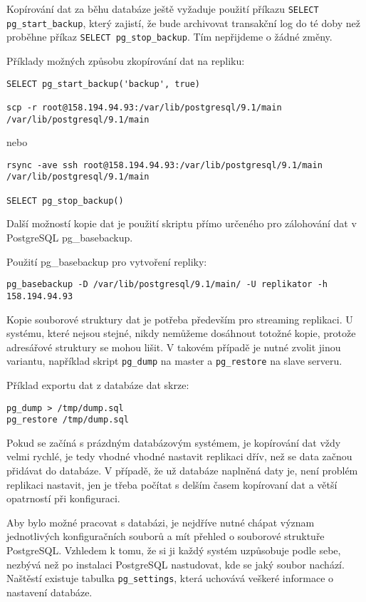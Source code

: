 Kopírování dat za běhu databáze ještě vyžaduje použití příkazu \texttt{SELECT pg\_start\_backup}, který zajistí, že bude archivovat transakční log do té doby než proběhne příkaz \texttt{SELECT pg\_stop\_backup}. Tím nepřijdeme o žádné změny.

Příklady možných způsobu zkopírování dat na repliku:

\begin{lstlisting}
SELECT pg_start_backup('backup', true)

scp -r root@158.194.94.93:/var/lib/postgresql/9.1/main /var/lib/postgresql/9.1/main
\end{lstlisting}
\indent nebo
\begin{lstlisting}
rsync -ave ssh root@158.194.94.93:/var/lib/postgresql/9.1/main /var/lib/postgresql/9.1/main

SELECT pg_stop_backup()
\end{lstlisting}

Další možností kopie dat je použití skriptu přímo určeného pro zálohování dat v PostgreSQL pg\_basebackup. 

Použití pg\_basebackup pro vytvoření repliky:

\begin{lstlisting}
pg_basebackup -D /var/lib/postgresql/9.1/main/ -U replikator -h 158.194.94.93
\end{lstlisting}

Kopie souborové struktury dat je potřeba především pro streaming replikaci. U systému, které nejsou stejné, nikdy nemůžeme dosáhnout totožné kopie, protože adresářové struktury se mohou lišit. V takovém případě je nutné zvolit jinou variantu, například skript \texttt{pg\_dump} na master a \texttt{pg\_restore} na slave serveru. 

Příklad exportu dat z databáze dat skrze:
\begin{lstlisting}
pg_dump > /tmp/dump.sql
pg_restore /tmp/dump.sql
\end{lstlisting}

Pokud se začíná s prázdným databázovým systémem, je kopírování dat vždy velmi rychlé, je tedy vhodné vhodné nastavit replikaci dřív, než se data začnou přidávat do databáze. V případě, že už databáze naplněná daty je, není problém replikaci nastavit, jen je třeba počítat s delším časem kopírovaní dat a větší opatrností při konfiguraci. 

Aby bylo možné pracovat s databázi, je nejdříve nutné chápat význam jednotlivých konfiguračních souborů a mít přehled o souborové struktuře PostgreSQL. Vzhledem k tomu, že si ji každý systém uzpůsobuje podle sebe, nezbývá než po instalaci PostgreSQL nastudovat, kde se jaký soubor nachází. Naštěstí existuje tabulka \texttt{pg\_settings}, která uchovává veškeré informace o nastavení databáze. 

